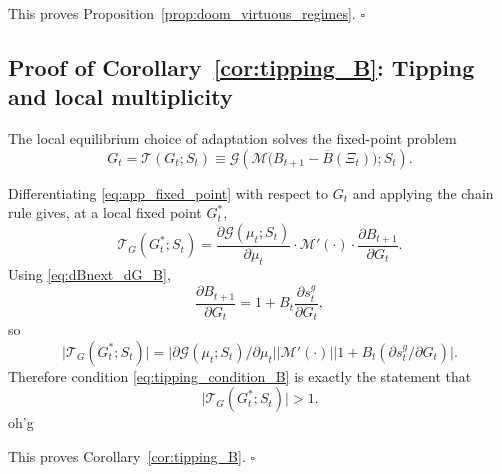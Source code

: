 \documentclass[12pt]{article}
\begin{document}
This proves Proposition~\ref{prop:doom_virtuous_regimes}. \hfill $\square$

\subsection{Proof of Corollary~\ref{cor:tipping_B}: Tipping and local multiplicity}
The local equilibrium choice of adaptation solves the fixed-point problem
\begin{equation}
  G_t
  =
  \mathcal{T}(G_t;S_t)
  \equiv
  \mathcal{G}\!\left(\mathcal{M}\big( B_{t+1}-\overline B(\Xi_t)\big);S_t\right).
  \label{eq:app_fixed_point}
\end{equation}

Differentiating \eqref{eq:app_fixed_point} with respect to $G_t$ and applying the chain rule gives, at a local fixed point $G_t^*$,
\begin{equation}
  \mathcal{T}_G(G_t^*;S_t)
  =
  \frac{\partial \mathcal{G}(\mu_t;S_t)}{\partial \mu_t}
  \cdot
  \mathcal{M}'\!(\cdot)
  \cdot
  \frac{\partial B_{t+1}}{\partial G_t}.
  \label{eq:app_Tprime_step1}
\end{equation}
Using \eqref{eq:dBnext_dG_B},
\begin{equation}
  \frac{\partial B_{t+1}}{\partial G_t}
  =
  1+B_t\frac{\partial s_t^g}{\partial G_t},
  \label{eq:app_Tprime_step2}
\end{equation}
so
\begin{equation}
  \big|\mathcal{T}_G(G_t^*;S_t)\big|
  =
  \big|\partial \mathcal{G}(\mu_t;S_t)/\partial \mu_t\big|
  \big|\mathcal{M}'(\cdot)\big|
  \big|1+B_t(\partial s_t^g/\partial G_t)\big|.
  \label{eq:app_Tprime_final}
\end{equation}
Therefore condition \eqref{eq:tipping_condition_B} is exactly the statement that
\begin{equation}
  \big|\mathcal{T}_G(G_t^*;S_t)\big|>1.
  \label{eq:app_noncontraction}
\end{equation}
oh'g

This proves Corollary~\ref{cor:tipping_B}. \hfill $\square$














\end{document}
